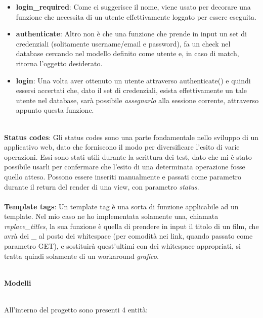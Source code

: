 \documentclass[12pt]{article}
\begin{document}
	\begin{itemize}
		\item \textbf{login\_required}: Come ci suggerisce il nome, viene usato per decorare una funzione che necessita di un utente effettivamente loggato per essere eseguita.
		
		\item \textbf{authenticate}: Altro non è che una funzione che prende in input un set di credenziali (solitamente username/email e password), fa un check nel database cercando nel modello definito come utente e, in caso di match, ritorna l'oggetto desiderato.
		
		\item \textbf{login}: Una volta aver ottenuto un utente attraverso authenticate() e quindi essersi accertati che, dato il set di credenziali, esista effettivamente un tale utente nel database, sarà possibile \textit{assegnarlo} alla sessione corrente, attraverso appunto questa funzione. \\ \\
	\end{itemize}
	
	\noindent \textbf{Status codes}: Gli status codes sono una parte fondamentale nello sviluppo di un applicativo web, dato che forniscono il modo per diversificare l'esito di varie operazioni. Essi sono stati utili durante la scrittura dei test, dato che mi è stato possibile usarli per confermare che l'esito di una determinata operazione fosse quello atteso. Possono essere inseriti manualmente e passati come parametro durante il return del render di una view, con parametro \textit{status}. \\ \\
	
	\noindent \textbf{Template tags}: Un template tag è una sorta di funzione applicabile ad un template. Nel mio caso ne ho implementata solamente una, chiamata \textit{replace\_titles}, la sua funzione è quella di prendere in input il titolo di un film, che avrà dei \_ al posto dei whitespace (per comodità nei link, quando passato come parametro GET), e sostituirà quest'ultimi con dei whitespace appropriati, si tratta quindi solamente di un workaround \textit{grafico}. \\ \\
	
	\pagebreak
	\noindent \centerline {\Huge \textbf{Modelli}} \\
	
	\noindent All'interno del progetto sono presenti 4 entità:
	
\end{document}
